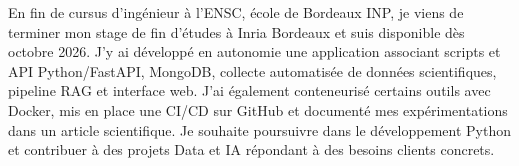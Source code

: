 
\begin{cvparagraph}
En fin de cursus d’ingénieur à l’ENSC, école de Bordeaux INP, je viens de terminer mon stage de fin d’études à Inria Bordeaux et suis disponible dès octobre 2026. J’y ai développé en autonomie une application associant scripts et API Python/FastAPI, MongoDB, collecte automatisée de données scientifiques, pipeline RAG et interface web. J’ai également conteneurisé certains outils avec Docker, mis en place une CI/CD sur GitHub et documenté mes expérimentations dans un article scientifique. Je souhaite poursuivre dans le développement Python et contribuer à des projets Data et IA répondant à des besoins clients concrets.
\end{cvparagraph}
